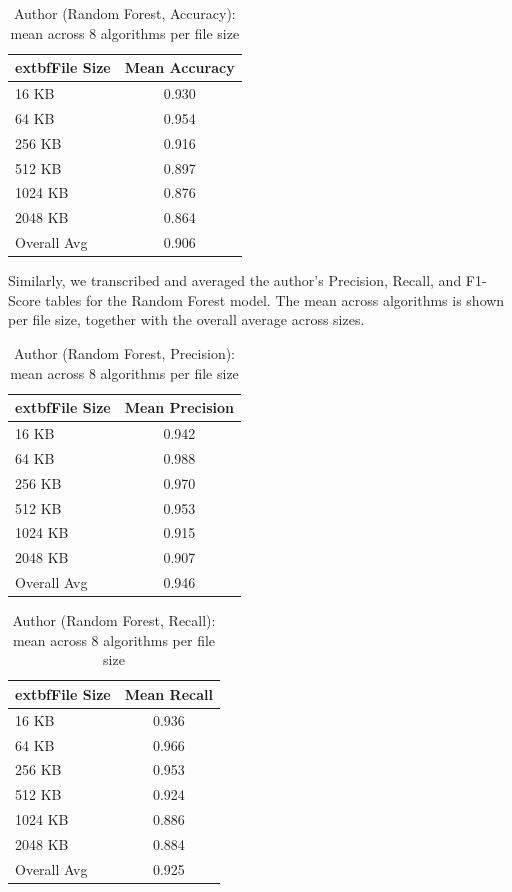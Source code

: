 \documentclass[12pt]{article}
\begin{document}
\begin{table}[h!]
\centering
\caption{Author (Random Forest, Accuracy): mean across 8 algorithms per file size}
\label{tab:auth-rf-acc-by-size}
\begin{tabular}{|l|c|}
\hline
	extbf{File Size} & \textbf{Mean Accuracy} \\
\hline
16 KB   & 0.930 \\
64 KB   & 0.954 \\
256 KB  & 0.916 \\
512 KB  & 0.897 \\
1024 KB & 0.876 \\
2048 KB & 0.864 \\
\hline
Overall Avg & 0.906 \\
\hline
\end{tabular}
\end{table}

Similarly, we transcribed and averaged the author's Precision, Recall, and F1-Score tables for the Random Forest model. The mean across algorithms is shown per file size, together with the overall average across sizes.

\begin{table}[h!]
\centering
\caption{Author (Random Forest, Precision): mean across 8 algorithms per file size}
\label{tab:auth-rf-prec-by-size}
\begin{tabular}{|l|c|}
\hline
	extbf{File Size} & \textbf{Mean Precision} \\
\hline
16 KB   & 0.942 \\
64 KB   & 0.988 \\
256 KB  & 0.970 \\
512 KB  & 0.953 \\
1024 KB & 0.915 \\
2048 KB & 0.907 \\
\hline
Overall Avg & 0.946 \\
\hline
\end{tabular}
\end{table}

\begin{table}[h!]
\centering
\caption{Author (Random Forest, Recall): mean across 8 algorithms per file size}
\label{tab:auth-rf-rec-by-size}
\begin{tabular}{|l|c|}
\hline
	extbf{File Size} & \textbf{Mean Recall} \\
\hline
16 KB   & 0.936 \\
64 KB   & 0.966 \\
256 KB  & 0.953 \\
512 KB  & 0.924 \\
1024 KB & 0.886 \\
2048 KB & 0.884 \\
\hline
Overall Avg & 0.925 \\
\hline
\end{tabular}
\end{table}
\end{document}
